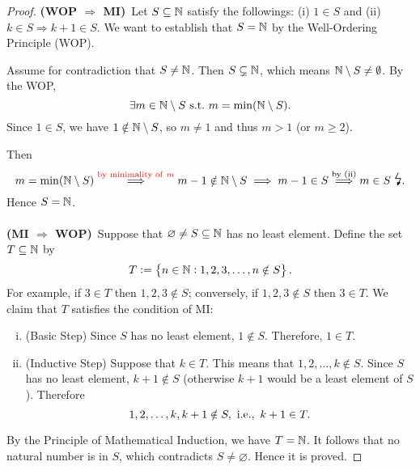 \documentclass[11pt,openany]{article}
\begin{document}

\newpage
{}
\begin{proof}
	\textbf{(WOP $\Rightarrow$ MI)}\ Let $S\subseteq\mathbb{N}$ satisfy the followings: (i) $1\in S$ and (ii) $k\in S\Rightarrow k+1\in S$. We want to establish that $S=\mathbb{N}$ by the Well-Ordering Principle (WOP). \par
	Assume for contradiction that $S\neq\mathbb{N}$. Then $S\subsetneq\mathbb{N}$, which means $\mathbb{N}\setminus S\neq\emptyset$. By the WOP, \[
	\exists m\in\N\setminus S\ \text{s.t.}\ m=\min(\N\setminus S).
	\] Since $1\in S$, we have $1\notin\mathbb{N}\setminus S$, so $m\neq 1$ and thus $m>1$ (or $m\geq 2$). 
	\begin{center}
	
	\end{center}
	Then \[
		m=\min(\N\setminus S)\overset{\textcolor{red}{\text{by minimality of}\ m}}{\implies} m-1\notin\N\setminus S \implies m-1\in S
		\overset{\text{by (ii)}}{\implies} m\in S\ \text{\Large\lightning}.
	\] Hence $S=\mathbb{N}$.\\
	\ \\
	\noindent \textbf{(MI $\Rightarrow$ WOP)}\ Suppose that $\varnothing\neq S\subseteq\mathbb{N}$ has no least element. Define the set $T\subseteq\mathbb{N}$ by \[
	T:=\set{n\in\mathbb{N}:1,2,3,\dots,n\notin S}.
	\]  For example, if $3\in T$ then $1,2,3\notin S$; conversely, if $1,2,3\notin S$ then $3\in T$. We claim that $T$ satisfies the condition of MI: \begin{enumerate}[(i)]
		\item (Basic Step) Since $S$ has no least element, $1\notin S$. Therefore, $1\in T$.
		\item (Inductive Step) Suppose that $k\in T$. This means that $1,2,\dots, k\notin S$. Since $S$ has no least element, $k+1\notin S$ (otherwise $k+1$ would be a least element of $S$). Therefore \[
		1,2,\dots,k,k+1\notin S,\ \ie,\ k+1\in T.
		\]
	\end{enumerate}
	By the Principle of Mathematical Induction, we have $T=\mathbb{N}$. It follows that no natural number is in $S$, which contradicts $S\neq\varnothing$. Hence it is proved.
\end{proof}
\end{document}
